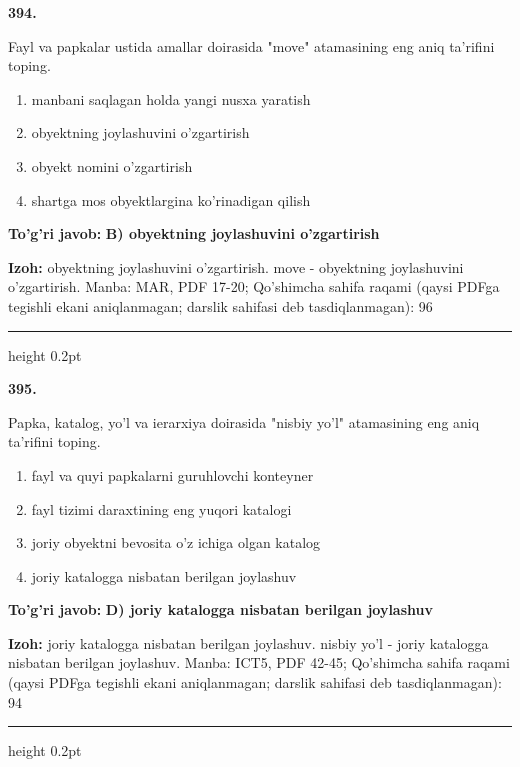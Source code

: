 \documentclass[10pt,a4paper]{article}
\begin{document}
{\bfseries\sffamily\color{ink} 394.}
\par
Fayl va papkalar ustida amallar doirasida "move" atamasining eng aniq ta'rifini toping.
\begin{enumerate}[label=\Alph*),leftmargin=9mm]
\item manbani saqlagan holda yangi nusxa yaratish
\item obyektning joylashuvini o'zgartirish
\item obyekt nomini o'zgartirish
\item shartga mos obyektlargina ko'rinadigan qilish
\end{enumerate}
\begin{tcolorbox}[enhanced,breakable,colback=teal!4,colframe=teal!60!black,boxrule=0.45pt,arc=1.2mm,left=2.7mm,right=2.7mm,top=1.8mm,bottom=1.8mm,before skip=2mm,after skip=2mm]
{\bfseries\sffamily\color{teal}To'g'ri javob:} \textbf{B) obyektning joylashuvini o'zgartirish}
\par\smallskip
{\bfseries Izoh:} obyektning joylashuvini o'zgartirish. move - obyektning joylashuvini o'zgartirish. Manba: MAR, PDF 17-20; Qo'shimcha sahifa raqami (qaysi PDFga tegishli ekani aniqlanmagan; darslik sahifasi deb tasdiqlanmagan): 96
\end{tcolorbox}
\vspace{2mm}\hrule height 0.2pt\vspace{3mm}

{\bfseries\sffamily\color{ink} 395.}
\par
Papka, katalog, yo'l va ierarxiya doirasida "nisbiy yo'l" atamasining eng aniq ta'rifini toping.
\begin{enumerate}[label=\Alph*),leftmargin=9mm]
\item fayl va quyi papkalarni guruhlovchi konteyner
\item fayl tizimi daraxtining eng yuqori katalogi
\item joriy obyektni bevosita o'z ichiga olgan katalog
\item joriy katalogga nisbatan berilgan joylashuv
\end{enumerate}
\begin{tcolorbox}[enhanced,breakable,colback=teal!4,colframe=teal!60!black,boxrule=0.45pt,arc=1.2mm,left=2.7mm,right=2.7mm,top=1.8mm,bottom=1.8mm,before skip=2mm,after skip=2mm]
{\bfseries\sffamily\color{teal}To'g'ri javob:} \textbf{D) joriy katalogga nisbatan berilgan joylashuv}
\par\smallskip
{\bfseries Izoh:} joriy katalogga nisbatan berilgan joylashuv. nisbiy yo'l - joriy katalogga nisbatan berilgan joylashuv. Manba: ICT5, PDF 42-45; Qo'shimcha sahifa raqami (qaysi PDFga tegishli ekani aniqlanmagan; darslik sahifasi deb tasdiqlanmagan): 94
\end{tcolorbox}
\vspace{2mm}\hrule height 0.2pt\vspace{3mm}
\end{document}
